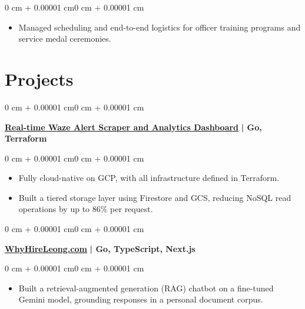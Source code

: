 \documentclass[10pt, letterpaper]{article}
\newenvironment{highlights}{
    \begin{itemize}[
        topsep=0.10 cm,
        parsep=0.10 cm,
        partopsep=0pt,
        itemsep=0pt,
        leftmargin=0 cm + 10pt
    ]
}{
    \end{itemize}
}
\newenvironment{onecolentry}{
    \begin{adjustwidth}{0 cm + 0.00001 cm}{0 cm + 0.00001 cm}
}{
    \end{adjustwidth}
}
\begin{document}
\vspace{0.10 cm}

\begin{onecolentry}
    \begin{highlights}
        \item Managed scheduling and end-to-end logistics for officer training programs and service medal ceremonies.
    \end{highlights}
\end{onecolentry}



\section{Projects}
\vspace{0.1cm}

\begin{onecolentry}
    \href{https://github.com/Lllllllleong/wazePoliceScraperGCP}{\textbf{Real-time Waze Alert Scraper and Analytics Dashboard}}\textbf{ | Go, Terraform}
\end{onecolentry}


\vspace{0.1cm}

\begin{onecolentry}
    \begin{highlights}
        \item Fully cloud-native on GCP, with all infrastructure defined in Terraform.
        \item Built a tiered storage layer using Firestore and GCS, reducing NoSQL read operations by up to 86\% per request.
    \end{highlights}
\end{onecolentry}

\vspace{0.2cm}

\begin{onecolentry}
    \href{https://www.whyhireleong.com/}{\textbf{WhyHireLeong.com}}\textbf{ | Go, TypeScript, Next.js}
\end{onecolentry}

\vspace{0.1cm}

\begin{onecolentry}
    \begin{highlights}
        \item Built a retrieval-augmented generation (RAG) chatbot on a fine-tuned Gemini model, grounding responses in a personal document corpus.
    \end{highlights}
\end{onecolentry}
\end{document}
